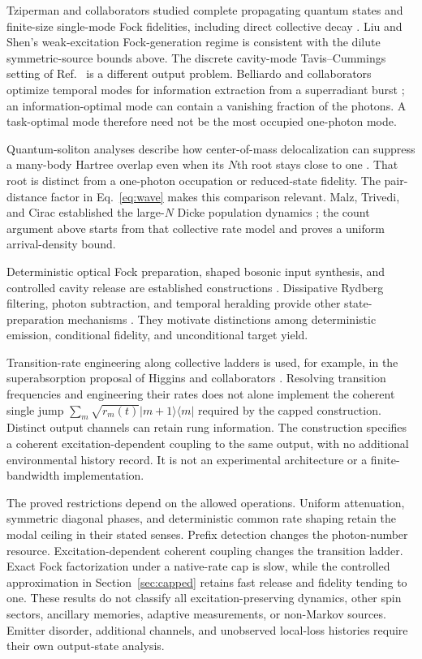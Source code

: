 \documentclass[11pt,a4paper]{article}
\begin{document}
Tziperman and collaborators studied complete propagating quantum
states and finite-size single-mode Fock fidelities, including
direct collective decay \cite{tziperman}. Liu and Shen's
weak-excitation Fock-generation regime \cite{liu} is consistent
with the dilute symmetric-source bounds above. The discrete
cavity-mode Tavis--Cummings setting of Ref.~\cite{yadav} is a
different output problem. Belliardo and collaborators optimize
temporal modes for information extraction from a superradiant
burst \cite{belliardo}; an information-optimal mode can contain
a vanishing fraction of the photons. A task-optimal mode therefore
need not be the most occupied one-photon mode.

Quantum-soliton analyses describe how center-of-mass
delocalization can suppress a many-body Hartree overlap even
when its \(N\)th root stays close to one \cite{holdaway}.
That root is distinct from a one-photon occupation or
reduced-state fidelity. The pair-distance factor in
Eq.~\eqref{eq:wave} makes this comparison relevant.
Malz, Trivedi, and Cirac established the large-\(N\) Dicke
population dynamics \cite{malz}; the count argument above
starts from that collective rate model and proves a uniform
arrival-density bound.

Deterministic optical Fock preparation, shaped bosonic input
synthesis, and controlled cavity release are established
constructions \cite{brown,gough,pfaff}. Dissipative Rydberg
filtering, photon subtraction, and temporal heralding provide
other state-preparation mechanisms \cite{gorshkov,pasharavesh,abudayyeh}.
They motivate distinctions among deterministic emission,
conditional fidelity, and unconditional target yield.

Transition-rate engineering along collective ladders is used,
for example, in the superabsorption proposal of Higgins and
collaborators \cite{higgins}. Resolving transition frequencies
and engineering their rates does not alone implement the
coherent single jump
\(\sum_m\sqrt{r_m(t)}|m+1\rangle\langle m|\) required by the
capped construction. Distinct output channels can retain rung
information. The construction specifies a coherent
excitation-dependent coupling to the same output, with no
additional environmental history record. It is not an
experimental architecture or a finite-bandwidth implementation.

The proved restrictions depend on the allowed operations.
Uniform attenuation, symmetric diagonal phases, and deterministic
common rate shaping retain the modal ceiling in their stated
senses. Prefix detection changes the photon-number resource.
Excitation-dependent coherent coupling changes the transition
ladder. Exact Fock factorization under a native-rate cap is slow,
while the controlled approximation in Section~\ref{sec:capped}
retains fast release and fidelity tending to one. These results
do not classify all excitation-preserving dynamics, other spin
sectors, ancillary memories, adaptive measurements, or non-Markov
sources. Emitter disorder, additional channels, and unobserved
local-loss histories require their own output-state analysis.
\end{document}
